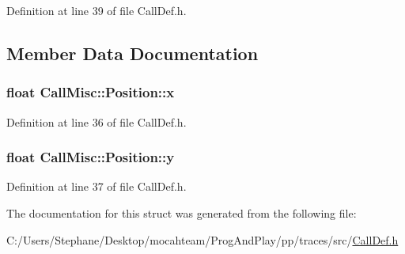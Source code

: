 Definition at line 39 of file Call\+Def.\+h.



\subsection{Member Data Documentation}
\subsubsection[{\texorpdfstring{x}{x}}]{\setlength{\rightskip}{0pt plus 5cm}float Call\+Misc\+::\+Position\+::x}\hypertarget{struct_call_misc_1_1_position_a4ba3eeb200b5d953be679bffe632c987}{}\label{struct_call_misc_1_1_position_a4ba3eeb200b5d953be679bffe632c987}


Definition at line 36 of file Call\+Def.\+h.

\subsubsection[{\texorpdfstring{y}{y}}]{\setlength{\rightskip}{0pt plus 5cm}float Call\+Misc\+::\+Position\+::y}\hypertarget{struct_call_misc_1_1_position_ae9515216882a99805c4b2b62c75cc1be}{}\label{struct_call_misc_1_1_position_ae9515216882a99805c4b2b62c75cc1be}


Definition at line 37 of file Call\+Def.\+h.



The documentation for this struct was generated from the following file\+:\begin{DoxyCompactItemize}
\item 
C\+:/\+Users/\+Stephane/\+Desktop/mocahteam/\+Prog\+And\+Play/pp/traces/src/\hyperlink{_call_def_8h}{Call\+Def.\+h}\end{DoxyCompactItemize}
